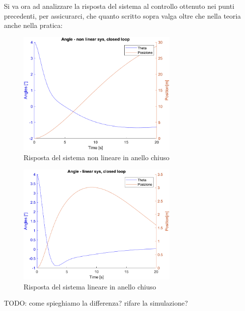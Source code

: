 Si va ora ad analizzare la risposta del sistema al controllo ottenuto nei punti precedenti, per assicurarci, che quanto scritto sopra valga oltre che nella teoria anche nella pratica:
\begin{figure}[H]
	\centering   	
	\includegraphics[width=0.7\textwidth]{Immagini/closed_loop_non_linear.png}
	\caption{Risposta del sistema non lineare in anello chiuso}
	\label{fig:closed_loop_non_linear_response}
\end{figure}
\begin{figure}[H]
	\centering   	
	\includegraphics[width=0.7\textwidth]{Immagini/closed_loop_linear.png}
	\caption{Risposta del sistema lineare in anello chiuso}
	\label{fig:closed_loop_non_linear_response}
\end{figure}
TODO: come spieghiamo la differenza? rifare la simulazione?


